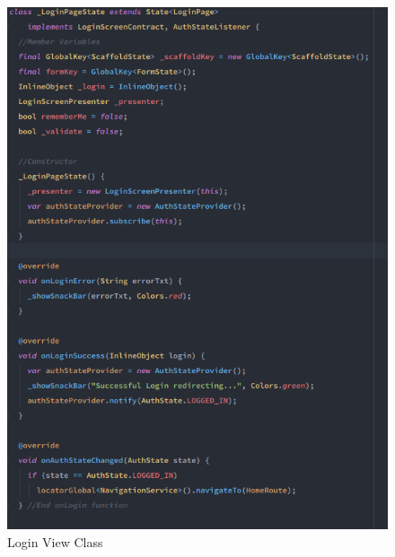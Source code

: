 \begin{figure}[h!]
    \caption{Login View Class}
    \label{image:loginViewClass}
    \centering
    \includegraphics[width=1.0\textwidth]{images/login_view_class_1.png}
\end{figure}

